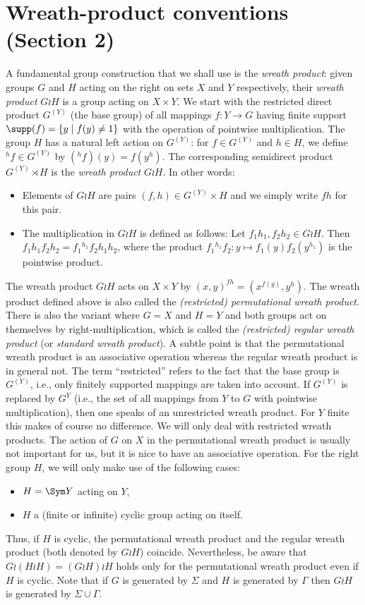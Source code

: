 \section*{Wreath-product conventions (Section 2)} \label{sec-wreath}

A fundamental group construction that we shall use is the \emph{wreath product}: 
given groups $G$ and $H$ acting on the right on sets $X$ and $Y$ respectively, their
\emph{wreath product} $G\wr H$ is a group acting on $X\times Y$. 
We start with the restricted direct product $G^{(Y)}$ (the base group) of all mappings $f : Y \to G$ having finite support
$\supp(f) = \{ y \mid f(y) \neq 1 \}$ with the operation of pointwise multiplication. 
The group $H$ has a natural left action on
$G^{(Y)}$: for $f \in G^{(Y)}$ and $h \in H$, we define ${}^h\!f \in G^{(Y)}$ by $({}^h\!f)(y) = f(y^h)$. 
The corresponding semidirect product $G^{(Y)} \rtimes H$ is the \emph{wreath product} $G \wr H$.  In other words:
\begin{itemize}
\item
Elements of $G \wr H$ are pairs $(f,h) \in G^{(Y)} \times H$ and we simply write $fh$ for this pair.
\item
The multiplication in $G \wr H$ is defined as follows:
Let $f_1h_1, f_2h_2 \in G \wr H$. Then
$f_1h_1f_2h_2 = f_1 {}^{h_1}\!\!f_2 h_1h_2$, where
the product $f_1 {}^{h_1}\!\!f_2\colon y \mapsto f_1(y) f_2(y^{h_1})$ is the pointwise product.
\end{itemize}
The wreath product $G \wr H$ acts on $X \times Y$ by $(x,y)^{fh} = (x^{f(y)},y^h)$.
The wreath product defined above is also called the {\em (restricted) permutational wreath product}. 
There is also the variant where $G=X$ and $H=Y$ and both groups act on themselves by right-multiplication, which is called
the {\em (restricted) regular wreath product} (or {\em standard wreath product}). A subtle point is that the permutational wreath product is an associative operation whereas
the regular wreath product is in general not. The term ``restricted'' refers to the fact that the base group is $G^{(Y)}$, i.e., only finitely supported mappings are taken into account.
If $G^{(Y)}$ is replaced by $G^Y$ (i.e., the set of all mappings from $Y$ to $G$ with pointwise multiplication), then one speaks of an unrestricted wreath product.
For $Y$ finite this makes of course no difference.
We will only deal with restricted wreath products.
The action of $G$ on $X$ in the permutational wreath product is usually not important for us, but it is nice to have an associative
operation. For the right group $H$, we will only make use of the following cases: 
\begin{itemize}
\item $H = \Sym Y$ acting on $Y$,
\item $H$ a (finite or infinite) cyclic group acting on itself.
\end{itemize}
Thus, if $H$ is cyclic, the permutational wreath product and the regular wreath product (both denoted by $G \wr H$) coincide. Nevertheless, be aware that $G \wr (H \wr H) = (G \wr H) \wr H$ holds only for the permutational wreath product even if $H$ is cyclic. 
Note that if $G$ is generated by $\Sigma$ and $H$ is generated by $\Gamma$ then $G \wr H$ is 
generated by $\Sigma \cup \Gamma$.


